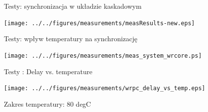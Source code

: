 \documentclass[compress,red]{beamer}
\begin{document}
\begin{frame}{Testy: synchronizacja w układzie kaskadowym}

    \begin{center}
    \texttt{[image: ../../figures/measurements/measResults-new.eps]}
    \end{center}


\end{frame}
\begin{frame}{Testy: wpływ temperatury na synchronizację}

    \begin{center}
    \texttt{[image: ../../figures/measurements/meas\_system\_wrcore.ps]}
    \end{center}

\end{frame}
\begin{frame}{Testy : Delay vs. temperature}

  \begin{center}
  \texttt{[image: ../../figures/measurements/wrpc\_delay\_vs\_temp.eps]}

  Zakres temperatury: 80 degC
  \end{center}

\end{frame}
\end{document}
